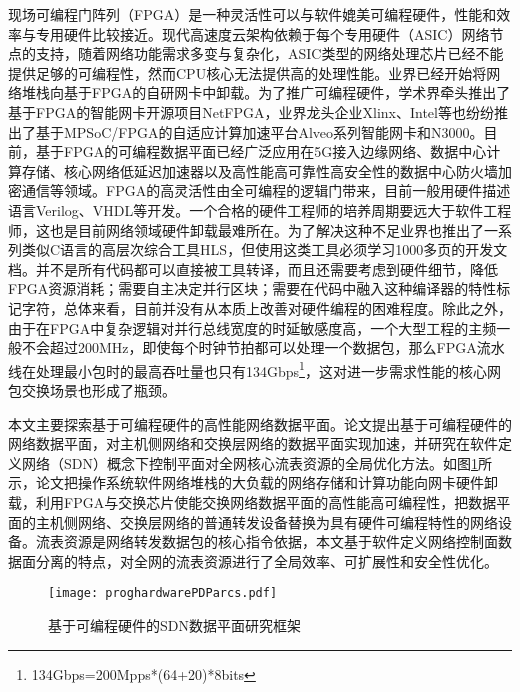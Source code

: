 现场可编程门阵列（FPGA）是一种灵活性可以与软件媲美可编程硬件，性能和效率与专用硬件比较接近。现代高速度云架构依赖于每个专用硬件（ASIC）网络节点的支持，随着网络功能需求多变与复杂化，ASIC类型的网络处理芯片已经不能提供足够的可编程性，然而CPU核心无法提供高的处理性能。业界已经开始将网络堆栈向基于FPGA的自研网卡中卸载。为了推广可编程硬件，学术界牵头推出了基于FPGA的智能网卡开源项目NetFPGA，业界龙头企业Xlinx、Intel等也纷纷推出了基于MPSoC/FPGA的自适应计算加速平台Alveo系列智能网卡和N3000。目前，基于FPGA的可编程数据平面已经广泛应用在5G接入边缘网络、数据中心计算存储、核心网络低延迟加速器以及高性能高可靠性高安全性的数据中心防火墙加密通信等领域。FPGA的高灵活性由全可编程的逻辑门带来，目前一般用硬件描述语言Verilog、VHDL等开发。一个合格的硬件工程师的培养周期要远大于软件工程师，这也是目前网络领域硬件卸载最难所在。为了解决这种不足业界也推出了一系列类似C语言的高层次综合工具HLS，但使用这类工具必须学习1000多页的开发文档。并不是所有代码都可以直接被工具转译，而且还需要考虑到硬件细节，降低FPGA资源消耗；需要自主决定并行区块；需要在代码中融入这种编译器的特性标记字符，总体来看，目前并没有从本质上改善对硬件编程的困难程度。除此之外，由于在FPGA中复杂逻辑对并行总线宽度的时延敏感度高，一个大型工程的主频一般不会超过200MHz，即使每个时钟节拍都可以处理一个数据包，那么FPGA流水线在处理最小包时的最高吞吐量也只有134Gbps\footnote{134Gbps=200Mpps*(64+20)*8bits}，这对进一步需求性能的核心网包交换场景也形成了瓶颈。


本文主要探索基于可编程硬件的高性能网络数据平面。论文提出基于可编程硬件的网络数据平面，对主机侧网络和交换层网络的数据平面实现加速，并研究在软件定义网络（SDN）概念下控制平面对全网核心流表资源的全局优化方法。如图\ref{fig:proghardwarePDParcs}所示，论文把操作系统软件网络堆栈的大负载的网络存储和计算功能向网卡硬件卸载，利用FPGA与交换芯片使能交换网络数据平面的高性能高可编程性，把数据平面的主机侧网络、交换层网络的普通转发设备替换为具有硬件可编程特性的网络设备。流表资源是网络转发数据包的核心指令依据，本文基于软件定义网络控制面数据面分离的特点，对全网的流表资源进行了全局效率、可扩展性和安全性优化。

\begin{figure}[!ht]
	\centering
	\texttt{[image: proghardwarePDParcs.pdf]}
	\caption{基于可编程硬件的SDN数据平面研究框架} \label{fig:proghardwarePDParcs}
\end{figure}

